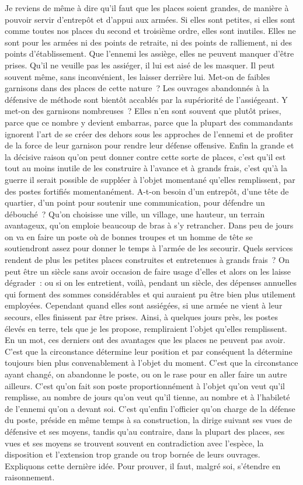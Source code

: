 \documentclass[french,twoside]{book} %
\begin{document}
Je reviens de même à dire qu’il faut que les places soient grandes, de manière à pouvoir servir d’entrepôt et d’appui aux armées. Si elles sont petites, si elles sont comme toutes nos places du second et troisième ordre, elles sont inutiles. Elles ne sont pour les armées ni des points de retraite, ni des points de ralliement, ni des points d’établissement. Que l’ennemi les assiège, elles ne peuvent manquer d’être prises. Qu’il ne veuille pas les assiéger, il lui est aisé de les masquer. Il peut souvent même, sans inconvénient, les laisser derrière lui. Met-on de faibles garnisons dans des places de cette nature ? Les ouvrages abandonnés à la défensive de méthode sont bientôt accablés par la supériorité de l’assiégeant. Y met-on des garnisons nombreuses ? Elles n’en sont souvent que plutôt prises, parce que ce nombre y devient embarras, parce que la plupart des commandants ignorent l’art de se créer des dehors sous les approches de l’ennemi et de profiter de la force de leur garnison pour rendre leur défense offensive. Enfin la grande et la décisive raison qu’on peut donner contre cette sorte de places, c’est qu’il est tout au moins inutile de les construire à l’avance et à grands frais, c’est qu’à la guerre il serait possible de suppléer à l’objet momentané qu’elles remplissent, par des postes fortifiés momentanément. A-t-on besoin d’un entrepôt, d’une tête de quartier, d’un point pour soutenir une communication, pour défendre un débouché ? Qu’on choisisse une ville, un village, une hauteur, un terrain avantageux, qu’on emploie beaucoup de bras à s’y retrancher. Dans peu de jours on va en faire un poste où de bonnes troupes et un homme de tête se soutiendront assez pour donner le temps à l’armée de les secourir. Quels services rendent de plus les petites places construites et entretenues à grands frais ? On peut être un siècle sans avoir occasion de faire usage d’elles et alors on les laisse dégrader : ou si on les entretient, voilà, pendant un siècle, des dépenses annuelles qui forment des sommes considérables et qui auraient pu être bien plus utilement employées. Cependant quand elles sont assiégées, si une armée ne vient à leur secours, elles finissent par être prises. Ainsi, à quelques jours près, les postes élevés en terre, tels que je les propose, rempliraient l’objet qu’elles remplissent. En un mot, ces derniers ont des avantages que les places ne peuvent pas avoir. C’est que la circonstance détermine leur position et par conséquent la détermine toujours bien plus convenablement à l’objet du moment. C’est que la circonstance ayant changé, on abandonne le poste, ou on le rase pour en aller faire un autre ailleurs. C’est qu’on fait son poste proportionnément à l’objet qu’on veut qu’il remplisse, au nombre de jours qu’on veut qu’il tienne, au nombre et à l’habileté de l’ennemi qu’on a devant soi. C’est qu’enfin l’officier qu’on charge de la défense du poste, préside en même temps à sa construction, la dirige suivant ses vues de défensive et ses moyens, tandis qu’au contraire, dans la plupart des places, ses vues et ses moyens se trouvent souvent en contradiction avec l’espèce, la disposition et l’extension trop grande ou trop bornée de leurs ouvrages. Expliquons cette dernière idée. Pour prouver, il faut, malgré soi, s’étendre en raisonnement.\par
\end{document}
